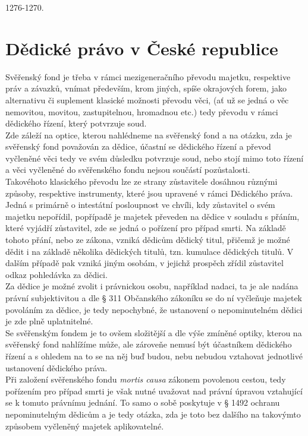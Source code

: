 \documentclass{article}
\begin{document}
1276-1270.

\newpage
\section{Dědické právo v České republice}

Svěřenský fond je třeba v rámci mezigeneračního převodu majetku, respektive práv a závazků, vnímat především, krom jiných, spíše okrajových forem, jako alternativu či suplement klasické možnosti převodu věci, (ať už se jedná o věc nemovitou, movitou, zastupitelnou, hromadnou etc.) tedy převodu v rámci dědického řízení, který potvrzuje soud.\\

Zde záleží na optice, kterou nahlédneme na svěřenský fond a na otázku, zda je svěřenský fond považován za dědice, účastní se dědického řízení a převod vyčleněné věci tedy ve svém důsledku potvrzuje soud, nebo stojí mimo toto řízení a věci vyčleněné do svěřenského fondu nejsou součástí pozůstalosti.\\

Takovéhoto klasického převodu lze ze strany zůstavitele dosáhnou různými způsoby, respektive instrumenty, které jsou upravené v rámci Dědického práva. Jedná s primárně o intestátní posloupnost ve chvíli, kdy zůstavitel o svém majetku nepořídil, popřípadě je majetek převeden na dědice v souladu s přáním, které vyjádří zůstavitel, zde se jedná o pořízení pro případ smrti. Na základě tohoto přání, nebo ze zákona, vzniká dědicům dědický titul, přičemž je možné dědit i na základě několika dědických titulů, tzn. kumulace dědických titulů. V dalším případě pak vzniká jiným osobám, v jejichž prospěch zřídil zůstavitel odkaz pohledávka za dědici.\\

Za dědice je možné zvolit i právnickou osobu, například nadaci, ta je ale nadána právní subjektivitou a dle § 311 Občanského zákoníku se do ní vyčleňuje majetek povoláním za dědice, je tedy nepochybné, že ustanovení o nepominutelném dědici je zde plně uplatnitelné.\\

Se svěřenským fondem je to ovšem složitější a dle výše zmíněné optiky, kterou na svěřenský fond nahlížíme může, ale zároveňe nemusí být účastníkem dědického řízení a s ohledem na to se na něj buď budou, nebu nebudou vztahovat jednotlivé ustanovení dědického práva.\\

Při založení svěřenského fondu \textit{mortis causa} zákonem povolenou cestou, tedy pořízením pro případ smrti je však nutné uvažovat nad právní úpravou vztahující se k tomuto právnímu jednání. To samo o sobě poskytuje v § 1492 ochranu nepominutelným dědicům a je tedy otázka, zda je toto bez dalšího na takovýmto způsobem vyčleněný majetek aplikovatelné.\\
\end{document}
